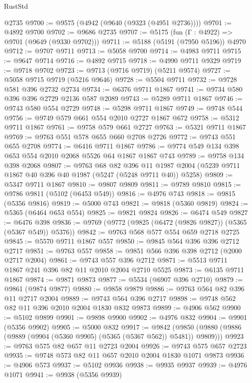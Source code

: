 \begin{lexlean}{RustStd}
\begin{coremodule}
    @2735
@9700 := @9575 (@4942 (@9640 (@9323 (@4951 @2736))))
@9701 := @4892 @9700
@9702 := @9686 @2735
@9707 := @5175 (fun (Γ : @4922) => @9701 (@9649 (@9330 @9702)))
@9711 := @5188 (@5191 (@7950 @5196)) @4970
@9712 := @9707 @9711
@9713 := @5058 @9700
@9714 := @4983 @9711
@9715 := @9647 @9714
@9716 := @4892 @9715
@9718 := @4990 @9711 @9329
@9719 := @9718 @9702
@9723 := @9713 (@9716 @9719) (@5211 @9574)
@9727 := @5058 @9715 @9719 (@5216 @9646)
@9728 := @5504 @9711
@9732 := @9728 @581 @396 @2732 @2734
@9734 := @6376 @9711 @1867
@9741 := @9734 @580 @396 @396 @2729 @2136 @587 @2089
@9743 := @5289 @9711 @1867
@9746 := @9743 @580 @554 @2729
@9748 := @5298 @9711 @1867
@9749 := @9748 @544
@9756 := @9749 @579 @661 @554 @2010 @2727 @1867 @672
@9758 := @5312 @9711 @1867
@9761 := @9758 @579 @661 @2727
@9763 := @5321 @9711 @1867
@9769 := @9763 @551 @578 @655 @660 @2708 @2726
@9772 := @9743 @551 @655 @2708
@9774 := @6416 @9711 @1867
@9786 := @9774 @549 @134 @398 @653 @554 @2010 @2068 @5526 @64 @1867 @1867 @743
@9789 := @9758 @134 @398 @2068
@9807 := @9763
    @68
    @82
    @396
    @11
    @1987
    @2004
    (@5239 @9711 @1867 @40 @396 @40 @1987 (@5247 (@5248 @9711 @40)) @5258)
@9809 := @5347 @9711 @1867
@9810 := @9807 @9809
@9811 := @9789 @9810
@9815 := @9786 @9811 (@5102 (@6453 @549))
@9816 := @4976 @743
@9818 := @9815 (@5356 @9816)
@9819 := @5000 @743
@9821 := @9818 (@5360 @9819)
@9824 := @5365 (@6464 @653 @554)
@9825 := @9821 @9824
@9826 := @6474 @549
@9827 := @6476 @398
@9836 := @9769 (@9772 (@9825 (@6472 (@9826 @9827)) (@5365 (@5367 @549)) @5376))
@9842 := @9763 @568 @577 @554 @659 @2718 @2725
@9845 := @5570 @9711 @1867 @557
@9850 := @9845 @564 @396 @396 @2712 @2717
@9851 := @9763 @557
@9858 := @9851 @566 @396 @398 @2712 (@2000 @2717 @2004)
@9861 := @9743 @557 @396 @2712
@9871 := @5513 @9711 @1867 @241 @396 @82 @11 @2010 @2004 @2710 @5525
@9873 := @6135 @9711 @1867
@9874 := @9871 @9873
@9877 := @5534 (@6907 @396 @2710)
@9879 := @9861 (@9874 @9877)
@9880 := @9858 @9879
@9886 := @9763 @564 @82 @396 @11 @2717 @2004
@9889 := @9743 @564 @396 @2717
@9898 := @9748 @562 @82 @11 @396 @2010 @2004 @1830 @832 @9873
@9899 := @4906 @562
@9900 := @5102 @9899
@9901 := @9898 @9900
@9902 := @4976 @832
@9904 := @9901 (@5356 @9902)
@9905 := @5000 @832
@9917 := @9842
    (@9850 (@9880 (@9886 (@9889 (@9904 (@5360 @9905) (@5365 (@5367 @562)) @5481)) @9809)))
@9923 := @9763 @575 @82 @657 @11 @2723 @2004
@9926 := @9743 @575 @657 @2723
@9935 := @9748 @573 @82 @11 @657 @2010 @2004 @1830 @1071 @9873
@9936 := @4906 @573
@9937 := @5102 @9936
@9938 := @9935 @9937
@9939 := @4976 @1071
@9941 := @9938 (@5356 @9939)

\end{coremodule}
\end{lexlean}
